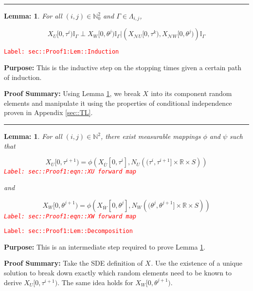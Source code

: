 \documentclass[12pt]{article}
\newcommand{\mb}{\mathbb}
\newcommand{\mc}{\mathcal}
\newcommand{\ov}{\overline}
\newcommand{\tr}{\textcolor{red}}
\newcommand{\labe}[1]{\tr{\texttt{Label: #1}}}
\newcommand{\purpose}{\textbf{Purpose: }}
\newcommand{\pfsum}{\textbf{Proof Summary: }}
\newcommand{\lin}{\rule{\linewidth}{0.4 pt}}
\newcommand{\neigh}{\mc{N}}					%
\renewcommand{\U}{U}							%
\newcommand{\UU}{W}								%
\renewcommand{\S}{S}							%
\newcommand{\cl}{\ov}							%
\newcommand{\poiss}[1]{N_{#1}}						%
\newcommand{\rt}[1]{\tau^{#1}}						%
\newcommand{\rtt}[1]{\theta^{#1}}					%
\renewcommand{\it}{k}								%
\newcommand{\itt}{i}								%
\newcommand{\ittt}{j}								%
\newcommand{\rxvts}[2]{X_{#1}{#2}}					%
\newcommand{\apath}{\Gamma}						%
\newcommand{\pathset}[2]{\Lambda_{#1,#2}}			%
\newtheorem{lem}[thms]{Lemma: }
\begin{document}
\lin

\begin{lem}
For all \((\itt,\ittt)\in \mb{N}_0^2\) and \(\apath \in \pathset{\itt}{\ittt}\),

\[\rxvts{\U}{[0,\rt{\itt})}\mb{I}_{\apath}\perp \rxvts{\UU}{[0,\rtt{\ittt})}\mb{I}_{\apath}|\left(\rxvts{\neigh{\U}}{[0,\rt{\it})},\rxvts{\neigh{\UU}}{[0,\rtt{\ittt})}\right)\mb{I}_{\apath}\]
\label{sec::Proof1:Lem::Induction}
\end{lem}
\labe{sec::Proof1:Lem::Induction}

\purpose This is the inductive step on the stopping times given a certain path of induction.

\pfsum Using Lemma \ref{sec::Proof1:Lem::Decomposition}, we break \(\rxvts{}{}\) into its component random elements and manipulate it using the properties of conditional independence proven in Appendix \ref{sec::TL}.

\lin

\begin{lem}
For all \((\itt,\ittt)\in \mb{N}^2\), there exist measurable mappings \(\phi\) and \(\psi\) such that 

\begin{equation}
\rxvts{\U}{[0,\rt{\itt+1})} = \phi\left(\rxvts{\cl{\U}}{[0,\rt{\itt}]}, \poiss{\U}\left((\rt{\itt}, \rt{\itt+1}]\times \mb{R}\times \S\right)\right)
\label{sec::Proof1:eqn::XU forward map}
\end{equation}
\labe{sec::Proof1:eqn::XU forward map}

and

\begin{equation}
\rxvts{\UU}{[0,\rtt{\ittt+1})} = \phi\left(\rxvts{\cl{\UU}}{[0,\rtt{\ittt}]}, \poiss{\UU}\left((\rtt{\ittt}, \rtt{\ittt+1}]\times \mb{R}\times \S\right)\right)
\label{sec::Proof1:eqn::XW forward map}
\end{equation}
\labe{sec::Proof1:eqn::XW forward map}

\label{sec::Proof1:Lem::Decomposition}
\end{lem}
\labe{sec::Proof1:Lem::Decomposition}

\purpose This is an intermediate step required to prove Lemma \ref{sec::Proof1:Lem::Induction}.

\pfsum Take the SDE definition of \(\rxvts{}{}\). Use the existence of a unique solution to break down exactly which random elements need to be known to derive \(\rxvts{\U}{[0,\rt{\itt+1})}\). The same idea holds for \(\rxvts{\UU}{[0,\rtt{\ittt+1})}\).
\end{document}
